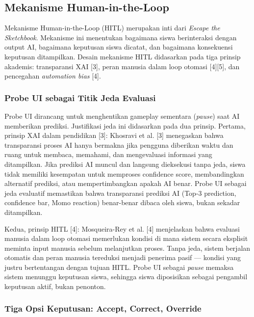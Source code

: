 \documentclass[10pt,twoside,openright]{report}
\begin{document}
\subsection{Mekanisme Human-in-the-Loop}
\label{subsec:mekanisme-hitl}

Mekanisme Human-in-the-Loop (HITL) merupakan inti dari \textit{Escape the Sketchbook}. Mekanisme ini menentukan bagaimana siswa berinteraksi dengan output AI, bagaimana keputusan siswa dicatat, dan bagaimana konsekuensi keputusan ditampilkan. Desain mekanisme HITL didasarkan pada tiga prinsip akademis: transparansi XAI [3], peran manusia dalam loop otomasi [4][5], dan pencegahan \textit{automation bias} [4].

\subsubsection{Probe UI sebagai Titik Jeda Evaluasi}

Probe UI dirancang untuk menghentikan gameplay sementara (\textit{pause}) saat AI memberikan prediksi. Justifikasi jeda ini didasarkan pada dua prinsip. Pertama, prinsip XAI dalam pendidikan [3]: Khosravi et al. [3] menegaskan bahwa transparansi proses AI hanya bermakna jika pengguna diberikan waktu dan ruang untuk membaca, memahami, dan mengevaluasi informasi yang ditampilkan. Jika prediksi AI muncul dan langsung dieksekusi tanpa jeda, siswa tidak memiliki kesempatan untuk memproses confidence score, membandingkan alternatif prediksi, atau mempertimbangkan apakah AI benar. Probe UI sebagai jeda evaluatif memastikan bahwa transparansi prediksi AI (Top-3 prediction, confidence bar, Momo reaction) benar-benar dibaca oleh siswa, bukan sekadar ditampilkan.

Kedua, prinsip HITL [4]: Mosqueira-Rey et al. [4] menjelaskan bahwa evaluasi manusia dalam loop otomasi memerlukan kondisi di mana sistem secara eksplisit meminta input manusia sebelum melanjutkan proses. Tanpa jeda, sistem berjalan otomatis dan peran manusia tereduksi menjadi penerima pasif --- kondisi yang justru bertentangan dengan tujuan HITL. Probe UI sebagai \textit{pause} memaksa sistem menunggu keputusan siswa, sehingga siswa diposisikan sebagai pengambil keputusan aktif, bukan penonton.

\subsubsection{Tiga Opsi Keputusan: Accept, Correct, Override}
\end{document}
